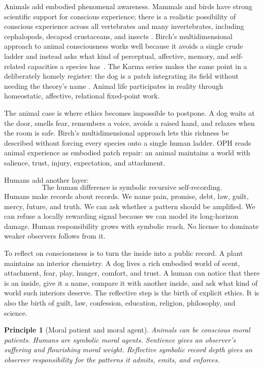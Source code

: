 \documentclass[11pt]{article}
\newtheorem{principle}[definition]{Principle}
\theoremstyle{remark}
\theoremstyle{plain}
\begin{document}
Animals add embodied phenomenal awareness. Mammals and birds have strong
scientific support for conscious experience; there is a realistic possibility
of conscious experience across all vertebrates and many invertebrates,
including cephalopods, decapod crustaceans, and insects
\cite{NYDeclaration2024,CambridgeDeclaration2012}. Birch's multidimensional
approach to animal consciousness works well because it avoids a
single crude ladder and instead asks what kind of perceptual, affective,
memory, and self-related capacities a species has~\cite{Birch2020}.
The Karma series makes the same point in a deliberately homely register: the
dog is a patch integrating its field without needing the theory's name
\cite{KarmaEveryone}. Animal life participates in
reality through homeostatic, affective, relational fixed-point work.

The animal case is where ethics becomes impossible to postpone. A dog waits at
the door, smells fear, remembers a voice, avoids a raised hand, and relaxes when
the room is safe. Birch's
multidimensional approach lets this richness be described
without forcing every species onto a single human ladder. OPH reads animal
experience as embodied patch repair: an animal maintains a world with salience,
trust, injury, expectation, and attachment.

Humans add another layer:
\[
\boxed{
\text{The human difference is symbolic recursive self-recording.}
}
\]
Humans make records about records. We name pain, promise, debt, law, guilt,
mercy, future, and truth. We can ask whether a pattern should be amplified. We
can refuse a locally rewarding signal because we can model its long-horizon
damage. Human responsibility grows with symbolic reach. No license to dominate
weaker observers follows from it.

To reflect on consciousness is to turn the inside into a public record. A plant
maintains an interior chemistry. A dog lives a rich embodied world of scent,
attachment, fear, play, hunger, comfort, and trust. A human can notice that
there is an inside, give it a name, compare it with another inside, and ask
what kind of world such interiors deserve. The reflective step is the birth of
explicit ethics. It is also the birth of guilt, law, confession, education,
religion, philosophy, and science.

\begin{principle}[Moral patient and moral agent]
Animals can be conscious moral patients. Humans are symbolic moral agents.
Sentience gives an observer's suffering and flourishing moral weight.
Reflective symbolic record depth gives an observer responsibility for the
patterns it admits, emits, and enforces.
\end{principle}
\end{document}

